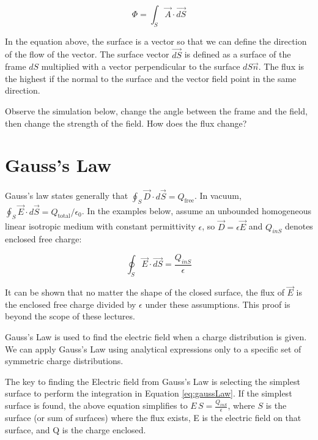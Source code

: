 \documentclass{ximera}
\begin{document}
\begin{equation}
\Phi=\int_S \vec{A} \cdot \vec{dS}
\end{equation}

In the equation above, the surface is a vector so that we can define the direction of the flow of the vector. The surface vector $\vec{dS}$ is defined as a surface of the frame $dS$ multiplied with a vector perpendicular to the surface $dS \vec{n}$. The flux is the highest if the normal to the surface and the vector field point in the same direction. 

\begin{example}

Observe the simulation below, change the angle between the frame and the field, then change the strength of the field. How does the flux change?



\begin{center}  
\end{center} 


\end{example}




\section{Gauss's Law}


Gauss's law states generally that $\oint_S\vec{D}\cdot d\vec{S}=Q_{\mathrm{free}}$. In vacuum, $\oint_S\vec{E}\cdot d\vec{S}=Q_{\mathrm{total}}/\epsilon_0$. In the examples below, assume an unbounded homogeneous linear isotropic medium with constant permittivity $\epsilon$, so $\vec{D}=\epsilon\vec{E}$ and $Q_{inS}$ denotes enclosed free charge:

\begin{equation}
\oint_S \vec{E} \cdot \vec{dS} = \frac{Q_{inS}}{\epsilon}\label{eq:gaussLaw}
\end{equation}


It can be shown that no matter the shape of the closed surface, the flux of $\vec{E}$ is the enclosed free charge divided by $\epsilon$ under these assumptions. This proof is beyond the scope of these lectures.


Gauss's Law is used to find the electric field when a charge distribution is given. We can apply Gauss's Law using analytical expressions only to a specific set of symmetric charge distributions.


 The key to finding the Electric field from Gauss's Law is selecting the simplest surface to perform the integration in Equation \ref{eq:gaussLaw}. If the simplest surface is found, the above equation simplifies to $E \, S = \frac{Q_{inS}}{\epsilon}$, where $S$ is the surface (or sum of surfaces) where the flux exists, E is the electric field on that surface, and Q is the charge enclosed.
 
\end{document}
